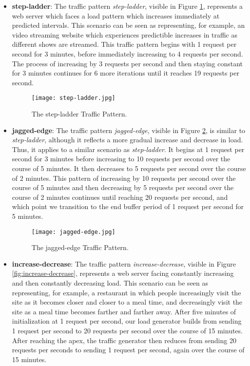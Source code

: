 \begin{itemize}
  \item \textbf{step-ladder}: The traffic pattern \textit{step-ladder}, visible
    in Figure \ref{fig:step-ladder}, represents a web server which faces a load
    pattern which increases immediately at predicted intervals. This scenario
    can be seen as representing, for example, an video streaming website which
    experiences predictible increases in traffic as different shows are
    streamed. This traffic pattern begins with 1 request per second for 3
    minutes, before immediately increasing to 4 requests per second. The process
    of increasing by 3 requests per second and then staying constant for 3
    minutes continues for 6 more iterations until it reaches 19 requests per
    second.

    \begin{figure}[!h]
      \centerline{\texttt{[image: step-ladder.jpg]}}
      \caption{The step-ladder Traffic Pattern.}
      \label{fig:step-ladder}
    \end{figure}

  \item \textbf{jagged-edge}: The traffic pattern \textit{jagged-edge}, visible
    in Figure \ref{fig:jagged-edge}, is similar to \textit{step-ladder},
    although it reflects a more gradual increase and decrease in load. Thus, it
    applies to a similar scenario as \textit{step-ladder}. It begins at 1
    request per second for 3 minutes before increasing to 10 requests per
    second over the course of 5 minutes. It then decreases to 5 requests per
    second over the course of 2 minutes. This pattern of increasing by 10
    requests per second over the course of 5 minutes and then decreasing by 5
    requests per second over the course of 2 minutes continues until reaching 20
    requests per second, and which point we transition to the end buffer period
    of 1 request per second for 5 minutes.

    \begin{figure}[!h]
      \centerline{\texttt{[image: jagged-edge.jpg]}}
      \caption{The jagged-edge Traffic Pattern.}
      \label{fig:jagged-edge}
    \end{figure}

  \item \textbf{increase-decrease}: The traffic pattern
    \textit{increase-decrease}, visible in Figure \ref{fig:increase-decrease},
    represents a web server facing constantly increasing and then constantly
    decreasing load. This scenario can be seen as representing, for example, a
    restaurant in which people increasingly visit the site as it becomes closer
    and closer to a meal time, and decreasingly visit the site as a meal time
    becomes farther and farther away. After five minutes of initialization at
    1 request per second, our load
    generator builds from sending 1 request per second to 20 requests per
    second over the course of 15 minutes. After reaching the apex, the traffic
    generator then reduces from sending 20 requests per seconds to sending 1
    request per second, again over the course of 15 minutes.


\end{itemize}
